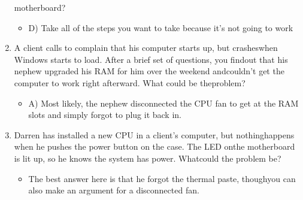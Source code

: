 \documentclass{article}
\begin{document}
\begin{enumerate}
motherboard?
    \begin{itemize}
        \item D) Take all of the steps you want to take because it’s not going to
work
    \end{itemize}
    \item A client calls to complain that his computer starts up, but crasheswhen Windows starts to load. After a brief set of questions, you findout that his nephew upgraded his RAM for him over the weekend andcouldn’t get the computer to work right afterward. What could be theproblem?
    \begin{itemize}
        \item A)   Most likely, the nephew disconnected the CPU fan to get at the RAM slots and simply forgot to plug it back in. 
    \end{itemize}
    \item Darren has installed a new CPU in a client’s computer, but nothinghappens when he pushes the power button on the case. The LED onthe motherboard is lit up, so he knows the system has power. Whatcould the problem be?
    \begin{itemize}
        \item The best answer here is that he forgot the thermal paste, thoughyou can also make an argument for a disconnected fan.
    \end{itemize}
\end{enumerate}
\end{document}
